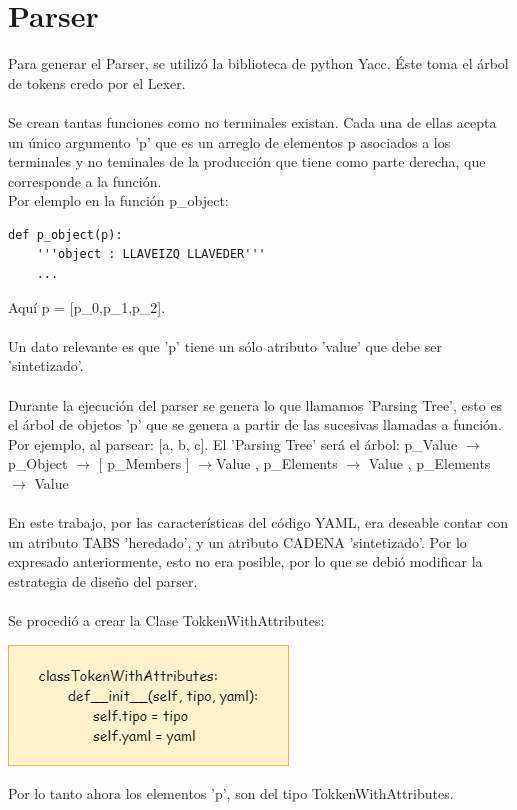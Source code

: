 \documentclass{article}
\begin{document}
\section{Parser}
Para generar el Parser, se utilizó la biblioteca de python Yacc. Éste toma el árbol de tokens credo por el Lexer.\\ \\
Se crean tantas funciones como no terminales existan. Cada una de ellas acepta un único argumento 'p' que es un arreglo de elementos p asociados a los terminales y no teminales de la producción que tiene como parte derecha, que corresponde a la función. \\
Por elemplo en la función p\_object:
\begin{verbatim}
def p_object(p):
    '''object : LLAVEIZQ LLAVEDER'''
    ...
\end{verbatim}
Aquí p = [p\_0,p\_1,p\_2].
\\ \\
Un dato relevante es que 'p' tiene un sólo atributo 'value' que debe ser 'sintetizado'. \\ \\
Durante la ejecución del parser se genera lo que llamamos 'Parsing Tree', esto es el árbol de objetos 'p' que se genera a partir de las sucesivas llamadas a función. \\
Por ejemplo, al parsear: [a, b, c]. El 'Parsing Tree' será el árbol: p\_Value $\rightarrow$ p\_Object $\rightarrow$ [ p\_Members ] $\rightarrow$Value , p\_Elements $\rightarrow$ Value , p\_Elements $\rightarrow$ Value 
\\ \\
En este trabajo, por las características del código YAML, era deseable contar con un atributo TABS 'heredado', y un atributo CADENA 'sintetizado'. Por lo expresado anteriormente, esto no era posible, por lo que se debió modificar la estrategia de diseño del parser. \\ \\
Se procedió a crear la Clase TokkenWithAttributes:
\begin{center}
\includegraphics[scale=.8]{img4.png}
\end{center}
Por lo tanto ahora los elementos 'p', son del tipo TokkenWithAttributes.
\end{document}
